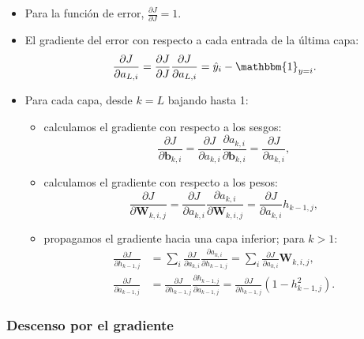 \begin{itemize}
\item Para la función de error, $\frac{\partial J}{\partial J} = 1$.
\item El gradiente del error con respecto a cada entrada de la última capa:
  \begin{equation}
    \frac{\partial J}{\partial a_{L, i}} =
    \frac{\partial J}{\partial J} \frac{\partial J}{\partial a_{L, i}} =
    \hat{y}_i - \mathbbm{1}_{y=i}. \label{derivtanh}
  \end{equation}
\item Para cada capa, desde $k = L$ bajando hasta 1:
  \begin{itemize}
  \item calculamos el gradiente con respecto a los sesgos:
    \begin{equation}
      \frac{\partial J}{\partial \bm{b}_{k, i}} =
      \frac{\partial J}{\partial a_{k, i}} \frac{\partial a_{k, i}}{\partial \bm{b}_{k, i}} =
      \frac{\partial J}{\partial a_{k, i}}, \label{biasgradient}
    \end{equation}
  \item calculamos el gradiente con respecto a los pesos:
    \begin{equation}
      \frac{\partial J}{\partial \bm{W}_{k, i, j}} =
      \frac{\partial J}{\partial a_{k, i}} \frac{\partial a_{k, i}}{\partial \bm{W}_{k, i, j}} =
      \frac{\partial J}{\partial a_{k, i}} h_{k-1, j}, \label{biasgradient}
    \end{equation}
  \item propagamos el gradiente hacia una capa inferior; para $k > 1$:
    \begin{align}
      \frac{\partial J}{\partial h_{k-1, j}} &=
      \sum_i \frac{\partial J}{\partial a_{k, i}} \frac{\partial a_{k,i}}{\partial h_{k-1, j}} =
      \sum_i \frac{\partial J}{\partial a_{k,i}} \bm{W}_{k, i, j}, \label{hiddenbackprop}\\
      \frac{\partial J}{\partial a_{k-1, j}} &=
      \frac{\partial J}{\partial h_{k-1, j}} \frac{\partial h_{k-1, j}}{\partial a_{k-1, j}} =
      \frac{\partial J}{\partial h_{k-1, j}} (1 - h_{k-1, j}^2). \label{combbackprop}
    \end{align}
  \end{itemize}
\end{itemize}

\subsubsection{Descenso por el gradiente}

